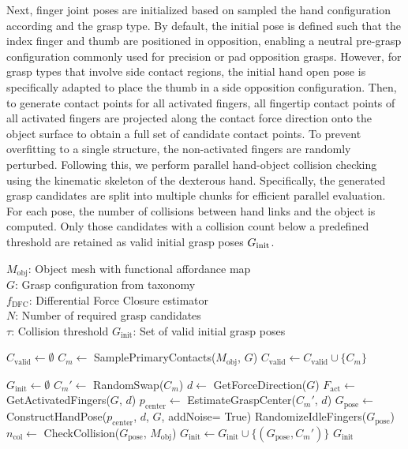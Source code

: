 Next, finger joint poses are initialized based on sampled the hand configuration according and the grasp type. 
By default, the initial pose is defined such that the index finger and thumb are positioned in opposition, enabling a neutral pre-grasp configuration commonly used for precision or pad opposition grasps. However, for grasp types that involve side contact regions, the initial hand open pose is specifically adapted to place the thumb in a side opposition configuration. Then, to generate contact points for all activated fingers, all fingertip contact points of all activated fingers are projected along the contact force direction onto the object surface to obtain a full set of candidate contact points. To prevent overfitting to a single structure, the non-activated fingers are randomly perturbed. Following this, we perform parallel hand-object collision checking using the kinematic skeleton of the dexterous hand. Specifically, the generated grasp candidates are split into multiple chunks for efficient parallel evaluation. 
For each pose, the number of collisions between hand links and the object is computed. Only those candidates with a collision count below a predefined threshold are retained as valid initial grasp poses $G_{\rm init}$.



\begin{algorithm}[t]
\caption{Functionality- and Grasp-Type-Aware Grasp Pose Sampling (AC-Sampler + Tax-DFCSampler)}
\label{alg:dfc_gps}
\begin{algorithmic}[1]
\REQUIRE $M_{\text{obj}}$: Object mesh with functional affordance map \\
         $G$: Grasp configuration from taxonomy \\
         $f_{\text{DFC}}$: Differential Force Closure estimator \\
         $N$: Number of required grasp candidates \\
         $\tau$: Collision threshold
\ENSURE $G_{\text{init}}$: Set of valid initial grasp poses

\STATE $C_{\text{valid}} \leftarrow \emptyset$
    \STATE $C_m \leftarrow$ SamplePrimaryContacts($M_{\text{obj}}$, $G$)
        \STATE $C_{\text{valid}} \leftarrow C_{\text{valid}} \cup \{C_m\}$
    \ENDIF
\ENDWHILE

\STATE $G_{\text{init}} \leftarrow \emptyset$
    \STATE $C_m' \leftarrow$ RandomSwap($C_m$)
    \STATE $d \leftarrow$ GetForceDirection($G$)
    \STATE $F_{\text{act}} \leftarrow$ GetActivatedFingers($G$, $d$)
    \STATE $p_{\text{center}} \leftarrow$ EstimateGraspCenter($C_m'$, $d$)
    \STATE $G_{\text{pose}} \leftarrow$ ConstructHandPose($p_{\text{center}}$, $d$, $G$, addNoise= True)
    \STATE RandomizeIdleFingers($G_{\text{pose}}$)
    \STATE $n_{\text{col}} \leftarrow$ CheckCollision($G_{\text{pose}}$, $M_{\text{obj}}$)
        \STATE $G_{\text{init}} \leftarrow G_{\text{init}} \cup \{(G_{\text{pose}}, C_m')\}$
    \ENDIF
\ENDFOR
\RETURN $G_{\text{init}}$
\end{algorithmic}
\end{algorithm}



